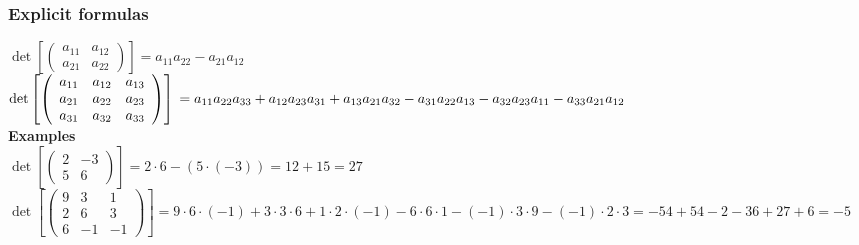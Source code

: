 \documentclass[10pt,a4paper]{article}
\begin{document}
\subsubsection{Explicit formulas}
$\det \left[ \left(\begin{array}{cc}
a_{11} & a_{12}\\
a_{21} & a_{22}
\end{array} \right) \right] = a_{11} a_{22} - a_{21} a_{12}$\\
$\det \left[ \left(\begin{array}{ccc}
a_{11} & a_{12} & a_{13}\\
a_{21} & a_{22} & a_{23}\\
a_{31} & a_{32} & a_{33}
\end{array} \right) \right] \\
\ \\
=a_{11} a_{22} a_{33} + a_{12}a_{23}a_{31}+a_{13}a_{21}a_{32}  -a_{31}a_{22}a_{13}-a_{32}a_{23}a_{11}-a_{33}a_{21}a_{12}$\\
\textbf{Examples}\\
$\det \left[ \left( \begin{array}{cc}
 2 & -3\\
 5 & 6
\end{array} \right) \right]
= 2 \cdot 6 - (5 \cdot (-3)) = 12 + 15 = 27$\\
$\det \left[ \left( \begin{array}{ccc}
 9 & 3 & 1\\
 2 & 6 & 3 \\
 6 & -1 & -1
\end{array} \right) \right]
= 9 \cdot 6 \cdot (-1) + 3 \cdot 3 \cdot 6 + 1 \cdot 2 \cdot (-1)
-6 \cdot 6 \cdot 1 - (-1) \cdot 3 \cdot 9 - (-1) \cdot 2 \cdot 3 
= -54 + 54 -2  - 36 +27 +6 = -5$\\
\end{document}
